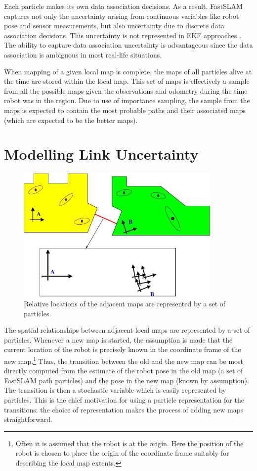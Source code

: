 Each particle makes its own data association decisions. As a result,
FastSLAM captures not only the uncertainty arising from 
continuous variables like robot pose and sensor measurements,
but also uncertainty due to discrete data association decisions. This
uncertainty is not represented in EKF approaches \cite{ekf_slam}.
The ability to capture data association uncertainty is advantageous since the data association is ambiguous in
most real-life situations.

When mapping of a given local map is complete, the maps of all
particles alive at the time are stored within the local map. This set
of maps is effectively a sample from all the possible maps given the
observations and odometry during the time robot was in the region.
Due to use of importance sampling, the sample from the maps is
expected to contain the most probable paths and their associated maps
(which are expected to be the better maps).

\section{Modelling Link Uncertainty}
\label{sec:link}

\begin{figure}
\begin{center}
\includegraphics[width=10cm]{Pics/fig_transition_model}
\end{center}
\caption[Modeling transition distribution]
{Relative locations of the adjacent maps are represented by a
  set of particles.}
\end{figure}

The spatial relationships between adjacent local maps are 
represented by a set of particles.  Whenever a new map is started, the assumption is made
that the current location of the robot is precisely known in the  coordinate frame of the new
map.\footnote{Often it is assumed that the robot is
at the origin.  Here the position of the robot is chosen to place the
origin of the coordinate frame suitably for describing the local map
extents.} Thus, the transition between the old and the new map can be
most directly computed from the estimate of the robot pose in the old
map (a set of FastSLAM path particles) and the pose in the new map
(known by assumption). The transition is then a stochastic variable
which is easily represented by particles. This is the chief
motivation for using a particle representation for the
transitions: the choice of representation makes the process of adding
new maps straightforward.

